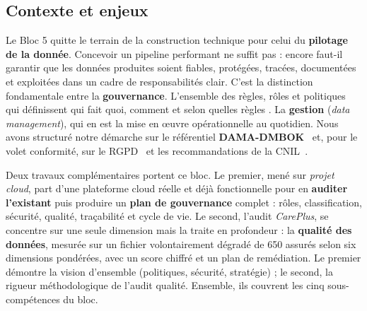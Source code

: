 \documentclass{article}
\begin{document}
\subsection{Contexte et enjeux}

Le Bloc 5 quitte le terrain de la construction technique pour celui du
\textbf{pilotage de la donnée}. Concevoir un pipeline performant ne suffit pas :
encore faut-il garantir que les données produites soient fiables, protégées,
tracées, documentées et exploitées dans un cadre de responsabilités clair. C'est
la distinction fondamentale entre la \textbf{gouvernance}. L'ensemble des
règles, rôles et politiques qui définissent \og qui fait quoi, comment et selon
quelles règles \fg{}. La \textbf{gestion} (\textit{data management}), qui en
est la mise en œuvre opérationnelle au quotidien. Nous avons structuré notre
démarche sur le référentiel \textbf{DAMA-DMBOK}~\cite{dama} et, pour le volet
conformité, sur le RGPD~\cite{rgpd} et les recommandations de la CNIL~\cite{cnil}.

Deux travaux complémentaires portent ce bloc. Le premier, mené sur
\textit{projet cloud}, part d'une plateforme cloud réelle et déjà fonctionnelle
pour en \textbf{auditer l'existant} puis produire un \textbf{plan de gouvernance}
complet : rôles, classification, sécurité, qualité, traçabilité et cycle de vie.
Le second, l'audit \textit{CarePlus}, se concentre sur une seule dimension mais la
traite en profondeur : la \textbf{qualité des données}, mesurée sur un fichier
volontairement dégradé de 650 assurés selon six dimensions pondérées, avec un score
chiffré et un plan de remédiation. Le premier démontre la vision d'ensemble
(politiques, sécurité, stratégie) ; le second, la rigueur méthodologique de l'audit
qualité. Ensemble, ils couvrent les cinq sous-compétences du bloc.
\end{document}
